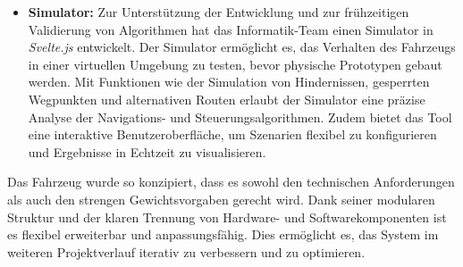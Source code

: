 \documentclass[main.tex]{subfiles} %
\begin{document}
\begin{itemize}
    \item \textbf{Simulator:} Zur Unterstützung der Entwicklung und zur frühzeitigen Validierung von Algorithmen hat das Informatik-Team einen Simulator in \textit{Svelte.js} entwickelt. Der Simulator ermöglicht es, das Verhalten des Fahrzeugs in einer virtuellen Umgebung zu testen, bevor physische Prototypen gebaut werden. Mit Funktionen wie der Simulation von Hindernissen, gesperrten Wegpunkten und alternativen Routen erlaubt der Simulator eine präzise Analyse der Navigations- und Steuerungsalgorithmen. Zudem bietet das Tool eine interaktive Benutzeroberfläche, um Szenarien flexibel zu konfigurieren und Ergebnisse in Echtzeit zu visualisieren.
\end{itemize}

Das Fahrzeug wurde so konzipiert, dass es sowohl den technischen Anforderungen
als auch den strengen Gewichtsvorgaben gerecht wird. Dank seiner modularen
Struktur und der klaren Trennung von Hardware- und Softwarekomponenten ist es
flexibel erweiterbar und anpassungsfähig. Dies ermöglicht es, das System im
weiteren Projektverlauf iterativ zu verbessern und zu optimieren.
\end{document}
